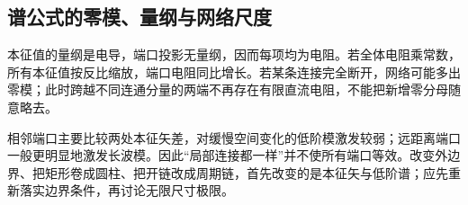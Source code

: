 \subsection{谱公式的零模、量纲与网络尺度}
本征值的量纲是电导，端口投影无量纲，因而每项均为电阻。若全体电阻乘常数，所有本征值按反比缩放，端口电阻同比增长。若某条连接完全断开，网络可能多出零模；此时跨越不同连通分量的两端不再存在有限直流电阻，不能把新增零分母随意略去。

相邻端口主要比较两处本征矢差，对缓慢空间变化的低阶模激发较弱；远距离端口一般更明显地激发长波模。因此“局部连接都一样”并不使所有端口等效。改变外边界、把矩形卷成圆柱、把开链改成周期链，首先改变的是本征矢与低阶谱；应先重新落实边界条件，再讨论无限尺寸极限。

